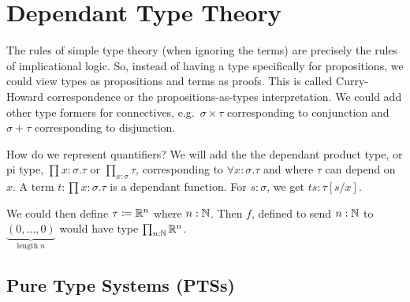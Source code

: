 \section{Dependant Type Theory}


The rules of simple type theory (when ignoring the terms) are precisely the rules of implicational logic. 
So, instead of having a type specifically for propositions, we could view types as propositions and terms as proofs. 
This is called \alert{Curry-Howard correspondence} or the \alert{propositions-as-types interpretation}.
We could add other type formers for connectives, e.g.\ $\sigma \times \tau$ corresponding to conjunction and $\sigma + \tau$ corresponding to disjunction.

How do we represent quantifiers?
We will add the the \alert{dependant product type}, or \alert{pi type}, $\prod x : \sigma. \tau$ or $\prod_{x : \sigma} \tau$, corresponding to $\forall x : \sigma. \tau$ and where $\tau$ can depend on $x$.
A term $t : \prod x : \sigma. \tau$ is a dependant function. 
For $s : \sigma$, we get $ts : \tau[s/x]$.

\begin{example}
    We could then define $\tau \coloneq \mathbb{R}^n$ where $n : \mathbb{N}$. 
    Then $f$, defined to send $n : \mathbb{N}$ to $\underbrace{(0, \dots, 0)}_{\text{length }n}$ would have type $\prod_{n : \mathbb{N}} \mathbb{R}^n$.
\end{example}

\subsection{Pure Type Systems (PTSs)}

